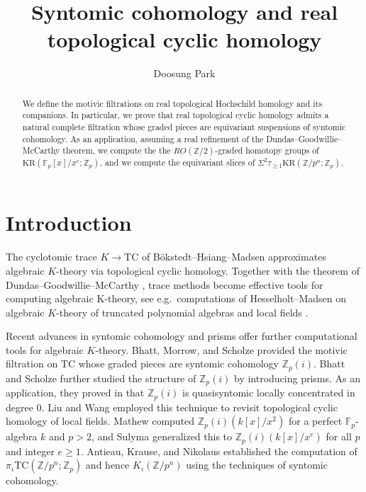 \documentclass[10pt]{amsart}
\theoremstyle{definition}
\numberwithin{equation}{section}
\newcommand{\F}{\mathbb{F}}
\newcommand{\Z}{\mathbb{Z}}
\newcommand{\TC}{\mathrm{TC}}
\begin{document}
\author{Doosung Park}
\address{Bergische Universit{\"a}t Wuppertal,
Fakult{\"a}t f\"ur Mathematik und Naturwissenschaften
\\
Gau{\ss}strasse 20, 42119 Wuppertal, Germany}

\title{Syntomic cohomology and real topological cyclic homology}

\begin{abstract}
We define the motivic filtrations on real topological Hochschild homology and its companions.
In particular,
we prove that real topological cyclic homology admits a natural complete filtration whose graded pieces are equivariant suspensions of syntomic cohomology.
As an application,
assuming a real refinement of the Dundas--Goodwillie--McCarthy theorem,
we compute the the $RO(\Z/2)$-graded homotopy groups of $\mathrm{KR}(\mathbb{F}_p[x]/x^e;\mathbb{Z}_p)$,
and we compute the equivariant slices of $\Sigma^2 \tau_{\geq 1}\mathrm{KR}(\mathbb{Z}/p^n;\mathbb{Z}_p)$.
\end{abstract}
\maketitle


\section{Introduction}

The cyclotomic trace $K\to \TC$ of B\"okstedt--Hsiang--Madsen \cite{BHM93} approximates algebraic $K$-theory via topological cyclic homology.
Together with the theorem of Dundas--Goodwillie--McCarthy \cite{DGM13},
trace methods become effective tools for computing algebraic K-theory,
see e.g.\ computations of Hesselholt--Madsen on algebraic $K$-theory of truncated polynomial algebras \cite{MR1471886} and local fields \cite{MR1998478}.

\medskip

Recent advances in syntomic cohomology and prisms offer further computational tools for algebraic $K$-theory.
Bhatt, Morrow, and Scholze \cite{BMS19} provided the motivic filtration on $\TC$ whose graded pieces are syntomic cohomology $\Z_p(i)$.
Bhatt and Scholze \cite{BS22} further studied the structure of $\Z_p(i)$ by introducing prisms.
As an application,
they proved in \cite[Theorem 1.18]{BS22} that $\Z_p(i)$ is quasisyntomic locally concentrated in degree $0$.
Liu and Wang \cite{MR4493328} employed this technique to revisit topological cyclic homology of local fields.
Mathew \cite[Theorem 10.4]{M21} computed $\Z_p(i)(k[x]/x^2)$ for a perfect $\F_p$-algebra $k$ and $p>2$, and Sulyma \cite{MR4632370} generalized this to $\Z_p(i)(k[x]/x^e)$ for all $p$ and integer $e\geq 1$.
Antieau, Krause, and Nikolaus \cite{AKN} established the computation of $\pi_i \TC(\Z/p^n;\Z_p)$ and hence $K_i(\Z/p^n)$ using the techniques of syntomic cohomology.
\end{document}
